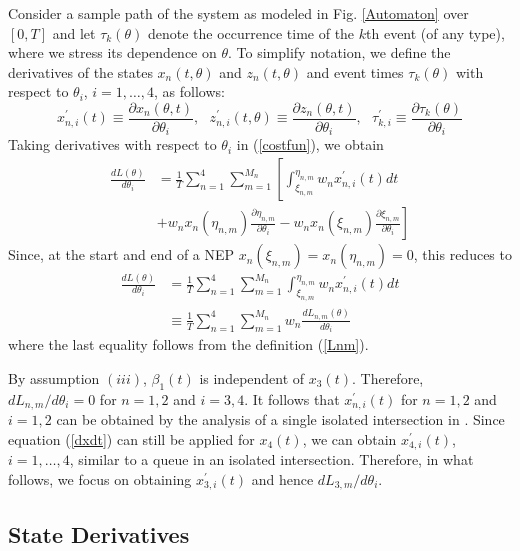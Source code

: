 \documentclass{ifacconf}\usepackage{graphicx}
\begin{document}
Consider a sample path of the system as modeled in Fig. \ref{Automaton} over
$[0,T]$ and let $\tau_{k}(\theta)$ denote the occurrence time of the $k$th
event (of any type), where we stress its dependence on $\theta$. To simplify
notation, we define the derivatives of the states $x_{n}(t,\theta)$ and
$z_{n}(t,\theta)$ and event times $\tau_{k}(\theta)$ with respect to
$\theta_{i}$, $i=1,\ldots,4$, as follows:
\begin{equation}
x_{n,i}^{\prime}(t)\equiv\frac{\partial x_{n}(\theta,t)}{\partial\theta_{i}},\text{ }z_{n,i}^{\prime}(t,\theta)\equiv\frac{\partial z_{n}(\theta
,t)}{\partial\theta_{i}},\text{ }\tau_{k,i}^{\prime}\equiv\frac{\partial
\tau_{k}(\theta)}{\partial\theta_{i}}\label{IPAnotation}\end{equation}
Taking derivatives with respect to $\theta_{i}$ in (\ref{costfun}), we obtain\begin{align*}
\frac{dL(\theta)}{d\theta_{i}} &  =\frac{1}{T}\sum\limits_{n=1}^{4}\sum\limits_{m=1}^{M_{n}}\left[  \int\nolimits_{\xi_{n,m}}^{\eta_{n,m}}w_{n}x_{n,i}^{\prime}(t)dt\right.  \\
&  +w_{n}x_{n}(\eta_{n,m})\frac{\partial\eta_{n,m}}{\partial\theta_{i}}-\left.  w_{n}x_{n}(\xi_{n,m})\frac{\partial\xi_{n,m}}{\partial\theta_{i}}\right]
\end{align*}
Since, at the start and end of a NEP $x_{n}(\xi_{n,m})=x_{n}(\eta_{n,m})=0$,
this reduces to\begin{align}
\frac{dL(\theta)}{d\theta_{i}} &  =\frac{1}{T}\sum\limits_{n=1}^{4}\sum\limits_{m=1}^{M_{n}}\int\nolimits_{\xi_{n,m}}^{\eta_{n,m}}w_{n}x_{n,i}^{\prime}(t)dt\label{dLi}\\
&  \equiv\frac{1}{T}\sum\limits_{n=1}^{4}\sum\limits_{m=1}^{M_{n}}w_{n}\frac{dL_{n,m}(\theta)}{d\theta_{i}}\nonumber
\end{align}
where the last equality follows from the definition (\ref{Lnm}).

By assumption $(iii)$, $\beta_{1}(t)$ is independent of $x_{3}(t)$. Therefore,
$dL_{n,m}/d\theta_{i}=0$ for $n=1,2$ and $i=3,4$. It follows that
$x_{n,i}^{\prime}(t)$ for $n=1,2$ and $i=1,2$ can be obtained by the analysis
of a single isolated intersection in \cite{GengCDC12}. Since equation
(\ref{dxdt}) can still be applied for $x_{4}(t)$, we can obtain $x_{4,i}^{\prime}(t)$, $i=1,\ldots,4$, similar to a queue in an isolated intersection.
Therefore, in what follows, we focus on obtaining $x_{3,i}^{\prime}(t)$ and
hence $dL_{3,m}/d\theta_{i}$.

\subsection{State Derivatives}
\end{document}
